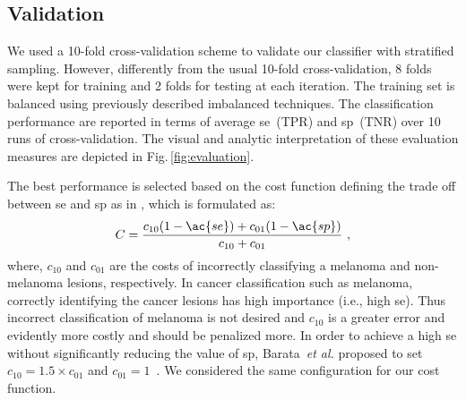\subsection{Validation}
We used a 10-fold cross-validation scheme to validate our classifier with stratified sampling.
However, differently from the usual 10-fold cross-validation, 8 folds were kept for training and 2 folds for testing at each iteration. 
The training set is balanced using previously described imbalanced techniques. 
The classification performance are reported in terms of average \ac{se}~(TPR) and \ac{sp}~(TNR) over 10 runs of cross-validation. 
The visual and analytic interpretation of these evaluation measures are depicted in Fig.\,\ref{fig:evaluation}.

The best performance is selected based on the cost function defining the trade off between \ac{se} and \ac{sp} as in \cite{barata2013towards}, which is formulated as:
\begin{equation}\label{eq:cost}
C = \frac{c_{10}(1-\ac{se})+c_{01}(1-\ac{sp})}{c_{10}+c_{01}} \ ,
\end{equation}
\noindent where, $c_{10}$ and $c_{01}$ are the costs of incorrectly classifying a melanoma and non-melanoma lesions, respectively.
In cancer classification such as melanoma, correctly identifying the cancer lesions has high importance (i.e., high \ac{se}). 
Thus incorrect classification of melanoma is not desired and $c_{10}$ is a greater error and evidently more costly and should be penalized more. 
In order to achieve a high \ac{se} without significantly reducing the value of \ac{sp}, Barata~\emph{et al.} proposed to set $c_{10} = 1.5 \times c_{01}$ and $c_{01} = 1$~\cite{barata2013towards}.  
We considered the same configuration for our cost function. 

